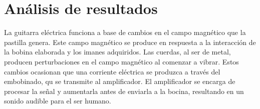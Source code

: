 \section{An\'alisis de resultados}
La guitarra el\'ectrica funciona a base de cambios en el campo magn\'etico que la pastilla genera. Este campo magn\'etico se produce en respuesta a 
la interacci\'on de la bobina elaborada y los imanes adquiridos. Las cuerdas, al ser de metal, producen perturbaciones en el campo magn\'etico al 
comenzar a vibrar. Estos cambios ocasionan que una corriente el\'ectrica se produzca a trav\'es del embobinado, qu se transmite al amplificador.
El amplificador se encarga de procesar la se\~nal y aumentarla antes de enviarla a la bocina, resultando en un sonido audible para el ser humano.